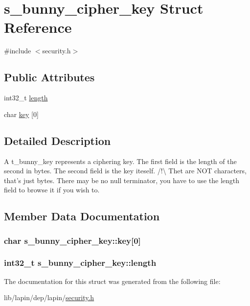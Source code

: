 \hypertarget{structs__bunny__cipher__key}{\section{s\-\_\-bunny\-\_\-cipher\-\_\-key Struct Reference}
\label{structs__bunny__cipher__key}
}


{\ttfamily \#include $<$security.\-h$>$}

\subsection*{Public Attributes}
\begin{DoxyCompactItemize}
\item 
int32\-\_\-t \hyperlink{structs__bunny__cipher__key_a47d8e4d04939992bed61375cb199fd1f}{length}
\item 
char \hyperlink{structs__bunny__cipher__key_ae394ebdec34f610a2fbf84acdbb8047c}{key} \mbox{[}0\mbox{]}
\end{DoxyCompactItemize}


\subsection{Detailed Description}
A t\-\_\-bunny\-\_\-key represents a ciphering key. The first field is the length of the second in bytes. The second field is the key iteself. /!\textbackslash{} Thet are N\-O\-T characters, that's just bytes. There may be no null terminator, you have to use the length field to browse it if you wish to. 

\subsection{Member Data Documentation}
\hypertarget{structs__bunny__cipher__key_ae394ebdec34f610a2fbf84acdbb8047c}{
\subsubsection[{key}]{\setlength{\rightskip}{0pt plus 5cm}char s\-\_\-bunny\-\_\-cipher\-\_\-key\-::key\mbox{[}0\mbox{]}}}\label{structs__bunny__cipher__key_ae394ebdec34f610a2fbf84acdbb8047c}
\hypertarget{structs__bunny__cipher__key_a47d8e4d04939992bed61375cb199fd1f}{
\subsubsection[{length}]{\setlength{\rightskip}{0pt plus 5cm}int32\-\_\-t s\-\_\-bunny\-\_\-cipher\-\_\-key\-::length}}\label{structs__bunny__cipher__key_a47d8e4d04939992bed61375cb199fd1f}


The documentation for this struct was generated from the following file\-:\begin{DoxyCompactItemize}
\item 
lib/lapin/dep/lapin/\hyperlink{security_8h}{security.\-h}\end{DoxyCompactItemize}
